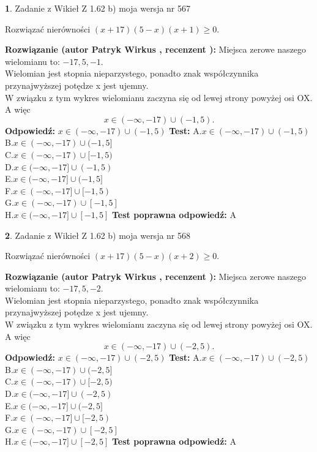 \documentclass[12pt, a4paper]{article}
\theoremstyle{definition} %
\newtheorem{zad}{}
\newcommand{\zadStart}[1]{\begin{zad}#1\newline}
\newcommand{\zadStop}{\end{zad}}
\newcommand{\rozwStart}[2]{\noindent \textbf{Rozwiązanie (autor #1 , recenzent #2): }\newline}
\newcommand{\rozwStop}{\newline}
\newcommand{\odpStart}{\noindent \textbf{Odpowiedź:}\newline}
\newcommand{\odpStop}{\newline}
\newcommand{\testStart}{\noindent \textbf{Test:}\newline}
\newcommand{\testStop}{\newline}
\newcommand{\kluczStart}{\noindent \textbf{Test poprawna odpowiedź:}\newline}
\newcommand{\kluczStop}{\newline}
\begin{document}
\zadStart{Zadanie z Wikieł Z 1.62 b) moja wersja nr 567}

Rozwiązać nierówności $(x+17)(5-x)(x+1)\ge0$.
\zadStop
\rozwStart{Patryk Wirkus}{}
Miejsca zerowe naszego wielomianu to: $-17, 5, -1$.\\
Wielomian jest stopnia nieparzystego, ponadto znak współczynnika przy\linebreak najwyższej potędze x jest ujemny.\\ W związku z tym wykres wielomianu zaczyna się od lewej strony powyżej osi OX. A więc $$x \in (-\infty,-17) \cup (-1,5).$$
\rozwStop
\odpStart
$x \in (-\infty,-17) \cup (-1,5)$
\odpStop
\testStart
A.$x \in (-\infty,-17) \cup (-1,5)$\\
B.$x \in (-\infty,-17) \cup (-1,5]$\\
C.$x \in (-\infty,-17) \cup [-1,5)$\\
D.$x \in (-\infty,-17] \cup (-1,5)$\\
E.$x \in (-\infty,-17] \cup (-1,5]$\\
F.$x \in (-\infty,-17] \cup [-1,5)$\\
G.$x \in (-\infty,-17) \cup [-1,5]$\\
H.$x \in (-\infty,-17] \cup [-1,5]$
\testStop
\kluczStart
A
\kluczStop



\zadStart{Zadanie z Wikieł Z 1.62 b) moja wersja nr 568}

Rozwiązać nierówności $(x+17)(5-x)(x+2)\ge0$.
\zadStop
\rozwStart{Patryk Wirkus}{}
Miejsca zerowe naszego wielomianu to: $-17, 5, -2$.\\
Wielomian jest stopnia nieparzystego, ponadto znak współczynnika przy\linebreak najwyższej potędze x jest ujemny.\\ W związku z tym wykres wielomianu zaczyna się od lewej strony powyżej osi OX. A więc $$x \in (-\infty,-17) \cup (-2,5).$$
\rozwStop
\odpStart
$x \in (-\infty,-17) \cup (-2,5)$
\odpStop
\testStart
A.$x \in (-\infty,-17) \cup (-2,5)$\\
B.$x \in (-\infty,-17) \cup (-2,5]$\\
C.$x \in (-\infty,-17) \cup [-2,5)$\\
D.$x \in (-\infty,-17] \cup (-2,5)$\\
E.$x \in (-\infty,-17] \cup (-2,5]$\\
F.$x \in (-\infty,-17] \cup [-2,5)$\\
G.$x \in (-\infty,-17) \cup [-2,5]$\\
H.$x \in (-\infty,-17] \cup [-2,5]$
\testStop
\kluczStart
A
\kluczStop
\end{document}
